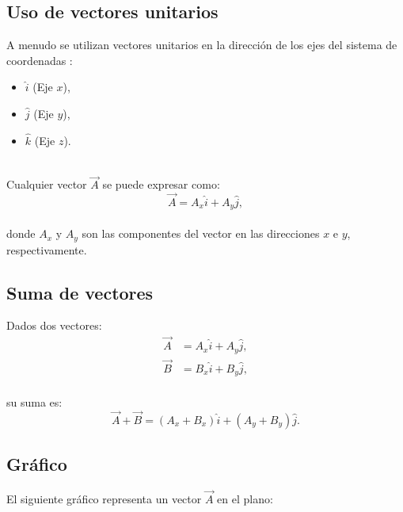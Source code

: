 \subsection{Uso de vectores unitarios}

A menudo se utilizan vectores unitarios en la dirección de los ejes del sistema de coordenadas :
\begin{itemize}
    \item $\hat{i}$ (Eje $x$),
    \item $\hat{j}$ (Eje $y$),
    \item $\hat{k}$ (Eje $z$).
\end{itemize}
\\
Cualquier vector $\vec{A}$ se puede expresar como:
\[
\vec{A} = A_x \hat{i} + A_y \hat{j},
\]
\\
donde $A_x$ y $A_y$ son las componentes del vector en las direcciones $x$ e $y$, respectivamente.

\subsection{Suma de vectores}

Dados dos vectores:
\begin{align*}
\vec{A} &= A_x \hat{i} + A_y \hat{j}, \\
\vec{B} &= B_x \hat{i} + B_y \hat{j},
\end{align*}
\\
su suma es:
\[
\vec{A} + \vec{B} = (A_x + B_x)\hat{i} + (A_y + B_y)\hat{j}.
\]

\newpage
\subsection{Gráfico}
El siguiente gráfico representa un vector $\vec{A}$ en el plano:

\begin{center}
\end{center}


